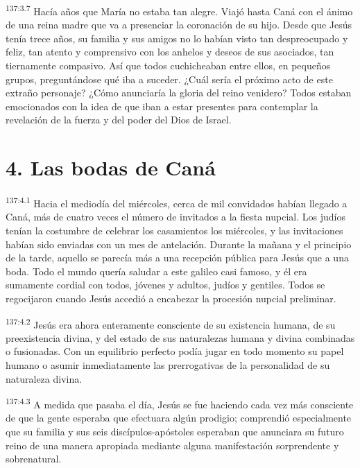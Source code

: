 \par 
\textsuperscript{137:3.7} Hacía años que María no estaba tan alegre. Viajó hasta Caná con el ánimo de una reina madre que va a presenciar la coronación de su hijo. Desde que Jesús tenía trece años, su familia y sus amigos no lo habían visto tan despreocupado y feliz, tan atento y comprensivo con los anhelos y deseos de sus asociados, tan tiernamente compasivo. Así que todos cuchicheaban entre ellos, en pequeños grupos, preguntándose qué iba a suceder. ¿Cuál sería el próximo acto de este extraño personaje? ¿Cómo anunciaría la gloria del reino venidero? Todos estaban emocionados con la idea de que iban a estar presentes para contemplar la revelación de la fuerza y del poder del Dios de Israel.

\section*{4. Las bodas de Caná}
\par 
\textsuperscript{137:4.1} Hacia el mediodía del miércoles, cerca de mil convidados habían llegado a Caná, más de cuatro veces el número de invitados a la fiesta nupcial. Los judíos tenían la costumbre de celebrar los casamientos los miércoles, y las invitaciones habían sido enviadas con un mes de antelación. Durante la mañana y el principio de la tarde, aquello se parecía más a una recepción pública para Jesús que a una boda. Todo el mundo quería saludar a este galileo casi famoso, y él era sumamente cordial con todos, jóvenes y adultos, judíos y gentiles. Todos se regocijaron cuando Jesús accedió a encabezar la procesión nupcial preliminar.

\par 
\textsuperscript{137:4.2} Jesús era ahora enteramente consciente de su existencia humana, de su preexistencia divina, y del estado de sus naturalezas humana y divina combinadas o fusionadas. Con un equilibrio perfecto podía jugar en todo momento su papel humano o asumir inmediatamente las prerrogativas de la personalidad de su naturaleza divina.

\par 
\textsuperscript{137:4.3} A medida que pasaba el día, Jesús se fue haciendo cada vez más consciente de que la gente esperaba que efectuara algún prodigio; comprendió especialmente que su familia y sus seis discípulos-apóstoles esperaban que anunciara su futuro reino de una manera apropiada mediante alguna manifestación sorprendente y sobrenatural.

